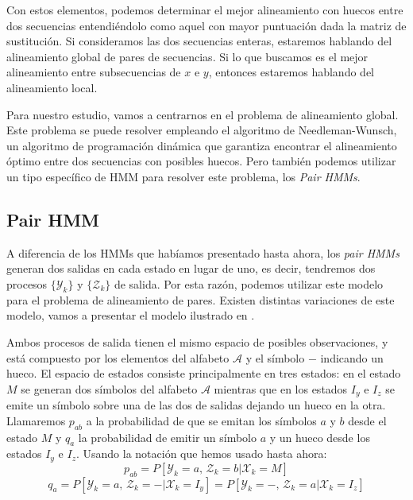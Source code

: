 Con estos elementos, podemos determinar el mejor alineamiento con huecos entre dos secuencias entendiéndolo como aquel con mayor puntuación dada la matriz de sustitución. Si consideramos las dos secuencias enteras, estaremos hablando del alineamiento global de pares de secuencias. Si lo que buscamos es el mejor alineamiento entre subsecuencias de $x$ e $y$, entonces estaremos hablando del alineamiento local.

Para nuestro estudio, vamos a centrarnos en el problema de alineamiento global. Este problema se puede resolver empleando el algoritmo de Needleman-Wunsch, un algoritmo de programación dinámica que garantiza encontrar el alineamiento óptimo entre dos secuencias con posibles huecos. Pero también podemos utilizar un tipo específico de HMM para resolver este problema, los \textit{Pair HMMs}.

\subsection{Pair HMM}
A diferencia de los HMMs que habíamos presentado hasta ahora, los \textit{pair HMMs} generan dos salidas en cada estado en lugar de uno, es decir, tendremos dos procesos $\{\mathcal{Y}_k\}$ y $\{\mathcal{Z}_k\}$ de salida. Por esta razón, podemos utilizar este modelo para el problema de alineamiento de pares. Existen distintas variaciones de este modelo, vamos a presentar el modelo ilustrado en \cite{Durbin}. 


Ambos procesos de salida tienen el mismo espacio de posibles observaciones, y está compuesto por los elementos del alfabeto $\mathcal{A}$ y el símbolo $-$ indicando un hueco. El espacio de estados consiste principalmente en tres estados: en el estado $M$ se generan dos símbolos del alfabeto $\mathcal{A}$ mientras que en los estados $I_y$ e $I_z$ se emite un símbolo sobre una de las dos de salidas dejando un hueco en la otra. Llamaremos $p_{ab}$ a la probabilidad de que se emitan los símbolos $a$ y $b$ desde el estado $M$ y $q_{a}$ la probabilidad de emitir un símbolo $a$ y un hueco desde los estados $I_y$ e $I_z$. Usando la notación que hemos usado hasta ahora:
\[p_{ab}=P[\mathcal{Y}_k=a,\, \mathcal{Z}_k=b|\mathcal{X}_k=M]\]
\[q_a=P[\mathcal{Y}_k=a,\, \mathcal{Z}_k=-|\mathcal{X}_k=I_y]=P[\mathcal{Y}_k=-,\, \mathcal{Z}_k=a|\mathcal{X}_k=I_z]\]


